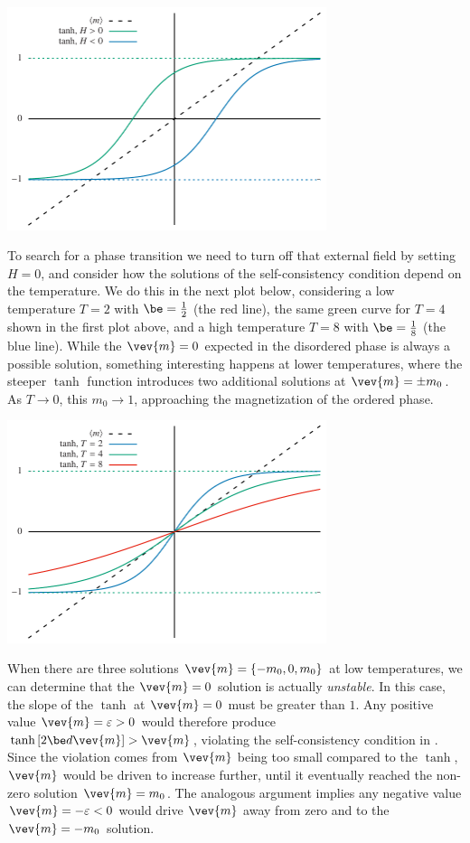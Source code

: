\begin{center}\includegraphics[width=0.7\textwidth]{figs/unit09_consistency_H-beta.pdf}\end{center}

To search for a phase transition we need to turn off that external field by setting $H = 0$, and consider how the solutions of the self-consistency condition depend on the temperature.
We do this in the next plot below, considering a low temperature $T = 2$ with $\be = \frac{1}{2}$ (the red line), the same green curve for $T = 4$ shown in the first plot above, and a high temperature $T = 8$ with $\be = \frac{1}{8}$ (the blue line).
While the $\vev{m} = 0$ expected in the disordered phase is always a possible solution, something interesting happens at lower temperatures, where the steeper $\tanh$ function introduces two additional solutions at $\vev{m} = \pm m_0$.
As $T \to 0$, this $m_0 \to 1$, approaching the magnetization of the ordered phase.

\begin{center}\includegraphics[width=0.7\textwidth]{figs/unit09_consistency_beta.pdf}\end{center}

When there are three solutions $\vev{m} = \left\{-m_0, 0, m_0\right\}$ at low temperatures, we can determine that the $\vev{m} = 0$ solution is actually \textit{unstable}.
In this case, the slope of the $\tanh$ at $\vev{m} = 0$ must be greater than $1$.
Any positive value $\vev{m} = \varepsilon > 0$ would therefore produce $\tanh\left[2\be d\vev{m}\right] > \vev{m}$, violating the self-consistency condition in .
Since the violation comes from $\vev{m}$ being too small compared to the $\tanh$, $\vev{m}$ would be driven to increase further, until it eventually reached the non-zero solution $\vev{m} = m_0$.
The analogous argument implies any negative value $\vev{m} = -\varepsilon < 0$ would drive $\vev{m}$ away from zero and to the $\vev{m} = -m_0$ solution.

